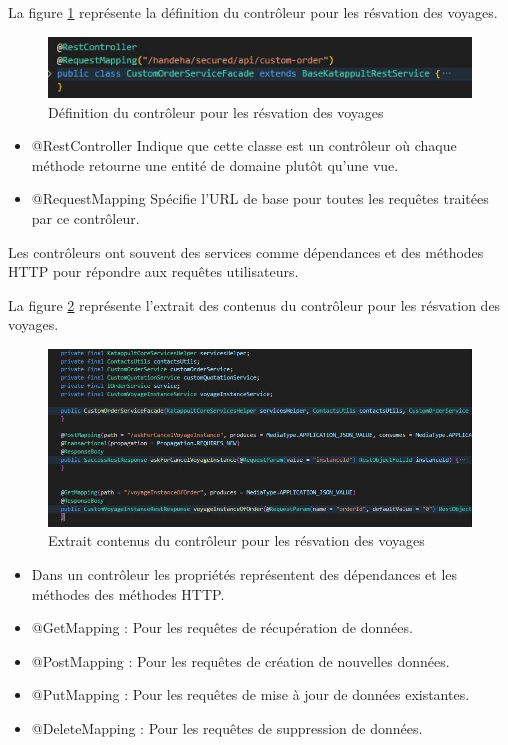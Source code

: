 \documentclass[12pt]{report}
\begin{document}
			La figure \ref{fig:controleur} représente la définition du contrôleur pour les résvation des voyages.
			
			\begin{figure}[h]
				\centering
				\includegraphics[width=\textwidth]{controleur.jpg}
				\caption{Définition du contrôleur pour les résvation des voyages}
				\label{fig:controleur}
			\end{figure}
			\FloatBarrier

			\begin{itemize}
				\item @RestController Indique que cette classe est un contrôleur où chaque méthode retourne une entité de domaine plutôt qu'une vue.
				\item @RequestMapping Spécifie l'URL de base pour toutes les requêtes traitées par ce contrôleur.
			\end{itemize}

			Les contrôleurs ont souvent des services comme dépendances et des méthodes HTTP pour répondre aux requêtes utilisateurs.

			La figure \ref{fig:contenuscontroleur} représente l'extrait des contenus du contrôleur pour les résvation des voyages.
			
			\begin{figure}[h]
				\centering
				\includegraphics[width=\textwidth]{contenuscontroleur.jpg}
				\caption{Extrait contenus du contrôleur pour les résvation des voyages}
				\label{fig:contenuscontroleur}
			\end{figure}
			\FloatBarrier
			\begin{itemize}
				\item Dans un contrôleur les propriétés représentent des dépendances et les méthodes des méthodes HTTP.
				\item @GetMapping : Pour les requêtes de récupération de données.
				\item @PostMapping : Pour les requêtes de création de nouvelles données.
				\item @PutMapping : Pour les requêtes de mise à jour de données existantes.
				\item @DeleteMapping : Pour les requêtes de suppression de données.
			\end{itemize}
			
\end{document}
